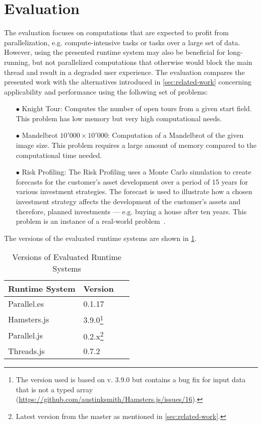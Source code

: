 \section{Evaluation}\label{sec:evaluation}
The evaluation focuses on computations that are expected to profit from parallelization, e.g. compute-intensive tasks or tasks over a large set of data. However, using the presented runtime system may also be beneficial for long-running, but not parallelized computations that otherwise would block the main thread and result in a degraded user experience. The evaluation compares the presented work with the alternatives introduced in \cref{sec:related-work} concerning applicability and performance using the following set of problems:

\begin{itemize}
	\item[$\bullet$] Knight Tour: Computes the number of open tours from a given start field. This problem has  low memory but very high computational needs.
	\item[$\bullet$] Mandelbrot $10'000 \times 10'000$: Computation of a Mandelbrot of the given image size. This problem requires a large amount of memory compared to the computational time needed.
	\item[$\bullet$] Risk Profiling: The Risk Profiling uses a Monte Carlo simulation to create forecasts for the customer's asset development over a period of 15 years for various investment strategies. The forecast is used to illustrate how a chosen investment strategy affects the development of the customer's assets and therefore, planned investments --- e.g. buying a house after ten years. This problem is an instance of a real-world problem~\cite{Kwsoft2016}.
\end{itemize}

The versions of the evaluated runtime systems are shown in \cref{tab:runtime-system-version}.

\begin{table}
	\centering
	\begin{tabular}{p{0.6\linewidth} l}
		\toprule
		Runtime System & Version \\ \midrule
		Parallel.es & 0.1.17 \\
		Hamsters.js & 3.9.0\footnote{The version used is based on v. 3.9.0 but contains a bug fix for input data that is not a typed array (\url{https://github.com/austinksmith/Hamsters.js/issues/16}).} \\
		Parallel.js & 0.2.x\footnote{Latest version from the master as mentioned in \cref{sec:related-work}.} \\
		Threads.js & 0.7.2 \\ \bottomrule
	\end{tabular}
	\caption{Versions of Evaluated Runtime Systems}
	\label{tab:runtime-system-version}
\end{table}


